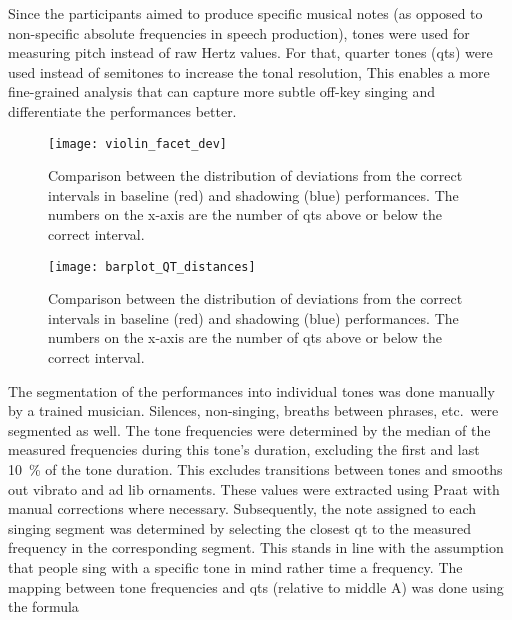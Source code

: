 Since the participants aimed to produce specific musical notes (as opposed to non-specific absolute frequencies in speech production), tones were used for measuring pitch instead of raw Hertz values.
For that, quarter tones (\acfp{qt}) were used instead of semitones to increase the tonal resolution, 
This enables a more fine-grained analysis that can capture more subtle off-key singing and differentiate the performances better.
%
\begin{figure}[t!]
	\centering
	\texttt{[image: violin\_facet\_dev]}
	\caption[Summary of within-participant interval deviation distribution]
		{Comparison between the distribution of deviations from the correct intervals in baseline (red) and shadowing (blue) performances.
		The numbers on the x-axis are the number of \acp{qt} above or below the correct interval.}
	\label{fig:violin_facet_dev}
\end{figure}
%
\begin{figure}[t!]
	\centering
	\texttt{[image: barplot\_QT\_distances]}
	\caption[Distribution of interval deviations]
	{Comparison between the distribution of deviations from the correct intervals in baseline (red) and shadowing (blue) performances.
		The numbers on the x-axis are the number of \acp{qt} above or below the correct interval.}
	\label{fig:barplot_QT_distances}
\end{figure}
%
The segmentation of the performances into individual tones was done manually by a trained musician.
Silences, non-singing, breaths between phrases, etc.\ were segmented as well.
The tone frequencies were determined by the median of the measured frequencies during this tone's duration, excluding the first and last \SI{10}{\percent} of the tone duration.
This excludes transitions between tones and smooths out vibrato and ad lib ornaments.
These values were extracted using Praat \citep{Boersma2001praat} with manual corrections where necessary.
Subsequently, the note assigned to each singing segment was determined by selecting the closest \ac{qt} to the measured frequency in the corresponding segment.
This stands in line with the assumption that people sing with a specific tone in mind rather time a frequency.
The mapping between tone frequencies and \acp{qt} (relative to middle A) was done using the formula
